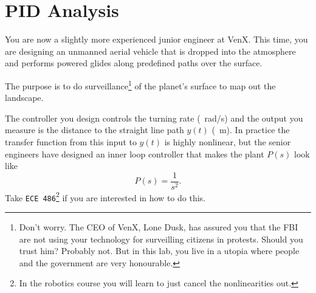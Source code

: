 \chapter{PID Analysis}\label{Lab:4}
You are now a slightly more experienced junior engineer at VenX.
This time, you are designing an unmanned aerial vehicle that is dropped into the atmosphere and performs powered glides along predefined paths over the surface.
%
\begin{center}
  
\end{center}
%
The purpose is to do surveillance\footnote{Don't worry. The CEO of VenX, Lone Dusk, has assured you that the FBI are not using your technology for surveilling citizens in protests. Should you trust him? Probably not. But in this lab, you live in a utopia where people and the government are very honourable.} of the planet's surface to map out the landscape.

The controller you design controls the turning rate (\SI{}{rad/s}) and the output you measure is the distance to the straight line path \(y(t)\) (\SI{}{m}).
In practice the transfer function from this input to \(y(t)\) is highly nonlinear, but the senior engineers have designed an inner loop controller that makes the plant \(P(s)\) look like
\[
  P(s) = \frac{1}{s^2}.
\]
Take \texttt{ECE 486}\footnote{In the robotics course you will learn to just cancel the nonlinearities out.} if you are interested in how to do this.

